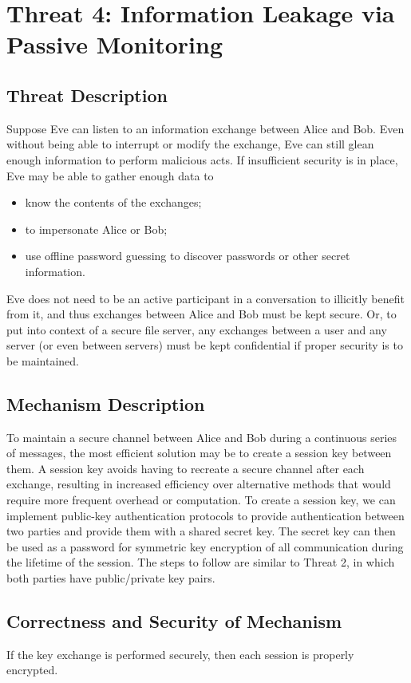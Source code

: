 \documentclass[11pt]{article}
\begin{document}
\section{Threat 4: Information Leakage via Passive Monitoring}
\subsection{Threat Description}
Suppose Eve can listen to an information exchange between Alice and Bob. Even without being able to interrupt or modify the exchange, Eve can still glean enough information to perform malicious acts. If insufficient security is in place, Eve may be able to gather enough data to
\begin{itemize}
\item know the contents of the exchanges;
\item to impersonate Alice or Bob;
\item use offline password guessing to discover passwords or other secret information.
\end{itemize}
Eve does not need to be an active participant in a conversation to illicitly benefit from it, and thus exchanges between Alice and Bob must be kept secure. Or, to put into context of a secure file server, any exchanges between a user and any server (or even between servers) must be kept confidential if proper security is to be maintained.
\subsection{Mechanism Description}
To maintain a secure channel between Alice and Bob during a continuous series of messages, the most efficient solution may be to create a session key between them. A session key avoids having to recreate a secure channel after each exchange, resulting in increased efficiency over alternative methods that would require more frequent overhead or computation. To create a session key, we can implement public-key authentication protocols to provide authentication between two parties and provide them with a shared secret key. The secret key can then be used as a password for symmetric key encryption of all communication during the lifetime of the session. The steps to follow are similar to Threat 2, in which both parties have public/private key pairs.
\subsection{Correctness and Security of Mechanism}
If the key exchange is performed securely, then each session is properly encrypted.
\end{document}
